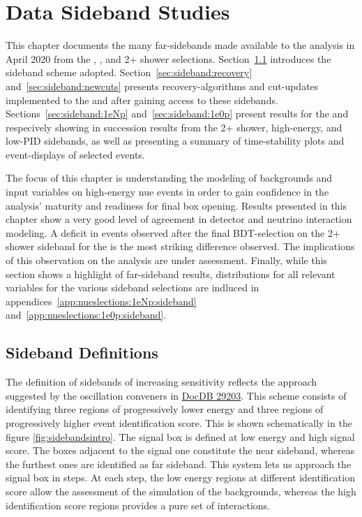 \section{Data Sideband Studies}{}
\label{sec:sidebands}
This chapter documents the many far-sidebands made available to the analysis in April 2020 from the \npsel, \zpsel, and 2+ shower selections. Section~\ref{sec:sideband:definitions} introduces the sideband scheme adopted. Section~\ref{sec:sideband:recovery} and~\ref{sec:sideband:newcuts} presents recovery-algorithms and cut-updates implemented to the \npsel and \zpsel after gaining access to these sidebands. Sections~\ref{sec:sideband:1eNp} and~\ref{sec:sideband:1e0p} present results for the \npsel and \zpsel respecively showing in succession results from the 2+ shower, high-energy, and low-PID sidebands, as well as presenting a summary of time-stability plots and event-displays of selected events. 

The focus of this chapter is understanding the modeling of backgrounds and input variables on high-energy nue events in order to gain confidence in the analysis' maturity and readiness for final box opening. Results presented in this chapter show a very good level of agreement in detector and neutrino interaction modeling. A deficit in events observed after the final BDT-selection on the 2+ shower sideband for the \npsel is the most striking difference observed. The implications of this observation on the analysis are under assessment. Finally, while this section shows a highlight of far-sideband results, distributions for all relevant variables for the various sideband selections are indluced in appendices~\ref{app:nueslections:1eNp:sideband} and~\ref{app:nueslections:1e0p:sideband}.

\subsection{Sideband Definitions}
\label{sec:sideband:definitions}
The definition of sidebands of increasing sensitivity reflects the approach suggested by the oscillation conveners in \href{https://microboone-docdb.fnal.gov/cgi-bin/private/ShowDocument?docid=29203}{DocDB 29203}.
This scheme consists of identifying three regions of progressively lower energy and three regions of progressively higher event identification score.
This is shown schematically in the figure \ref{fig:sidebandsintro}.
The signal box is defined at low energy and high signal score.
The boxes adjacent to the signal one constitute the near sideband, whereas the furthest ones are identified as far sideband.
This system lets us approach the signal box in steps.
At each step, the low energy regions at different identification score allow the assessment of the simulation of the backgrounds, whereas the high identification score regions provides a pure set of \nuecc interactions.

